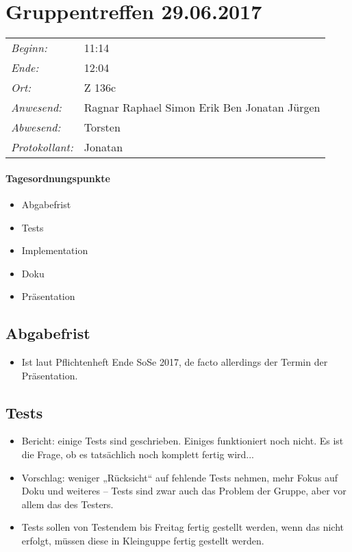 \documentclass{scrartcl}
\date{29.06.2017}	%
\begin{document}
\maketitle
\section{Gruppentreffen 29.06.2017}	%
\begin{tabular}[t]{p{.25\linewidth} p{.25\linewidth}}
\emph{Beginn:}				& 11:14\\
\emph{Ende:}					& 12:04\\
\emph{Ort:}						& Z 136c\\
\emph{Anwesend:}	& 
Ragnar\newline
Raphael\newline
Simon\newline
Erik\newline
Ben\newline
Jonatan\newline
Jürgen
\\
\emph{Abwesend:}		 & 
Torsten
\\
\emph{Protokollant:}& Jonatan
\end{tabular}
\paragraph{Tagesordnungspunkte}
\begin{itemize}
\item Abgabefrist
\item Tests
\item Implementation
\item Doku
\item Präsentation
\end{itemize}

\subsection{Abgabefrist}
\begin{itemize}
\item Ist laut Pflichtenheft Ende SoSe 2017, de facto allerdings der Termin der Präsentation.
\end{itemize}

\subsection{Tests}
\begin{itemize}
\item Bericht: einige Tests sind geschrieben. Einiges funktioniert noch nicht. Es ist die Frage, ob es tatsächlich noch komplett fertig wird...
\item Vorschlag: weniger „Rücksicht“ auf fehlende Tests nehmen, mehr Fokus auf Doku und weiteres -- Tests sind zwar auch das Problem der Gruppe, aber vor allem das des Testers.
\item Tests sollen von Testendem bis Freitag fertig gestellt werden, wenn das nicht erfolgt, müssen diese in Kleinguppe fertig gestellt werden.
\end{itemize}
\end{document}
